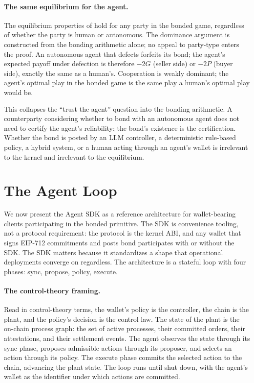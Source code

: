 \documentclass[11pt,a4paper]{article}
\theoremstyle{definition}
\theoremstyle{remark}
\newcommand{\pay}{P}
\newcommand{\cumval}{G}
\begin{document}
\paragraph{The same equilibrium for the agent.}
The equilibrium properties of  hold for any
party in the bonded game, regardless of whether the party is human
or autonomous. The dominance argument is constructed from the
bonding arithmetic alone; no appeal to party-type enters the
proof. An autonomous agent that defects forfeits its
bond; the agent's expected payoff under defection is therefore
$-2\cumval$ (seller side) or $-2\pay$ (buyer side), exactly the
same as a human's. Cooperation is weakly dominant; the agent's
optimal play in the bonded game is the same play a human's optimal
play would be.

This collapses the ``trust the agent'' question into the bonding
arithmetic. A counterparty considering whether to bond with an
autonomous agent does not need to certify the agent's reliability;
the bond's existence is the certification. Whether the bond is
posted by an LLM controller, a deterministic rule-based policy, a
hybrid system, or a human acting through an agent's wallet is
irrelevant to the kernel and irrelevant to the equilibrium.

\section{The Agent Loop}
\label{sec:loop}

We now present the Agent SDK as a reference architecture for
wallet-bearing clients participating in the bonded primitive. The
SDK is convenience tooling, not a protocol requirement: the
protocol is the kernel ABI, and any wallet that signs EIP-712
commitments and posts bond participates with or without the SDK.
The SDK matters because it standardizes a shape that operational
deployments converge on regardless. The architecture is a stateful
loop with four phases: sync, propose, policy, execute.

\paragraph{The control-theory framing.}
Read in control-theory terms, the wallet's policy is the
controller, the chain is the plant, and the policy's decision is
the control law.
The state of the plant is the on-chain process graph: the set of
active processes, their committed orders, their attestations, and
their settlement events. The agent observes the state through its
sync phase, proposes admissible actions through its proposer, and
selects an action through its policy. The execute phase commits
the selected action to the chain, advancing the plant state. The
loop runs until shut down, with the agent's wallet as the
identifier under which actions are committed.
\end{document}
